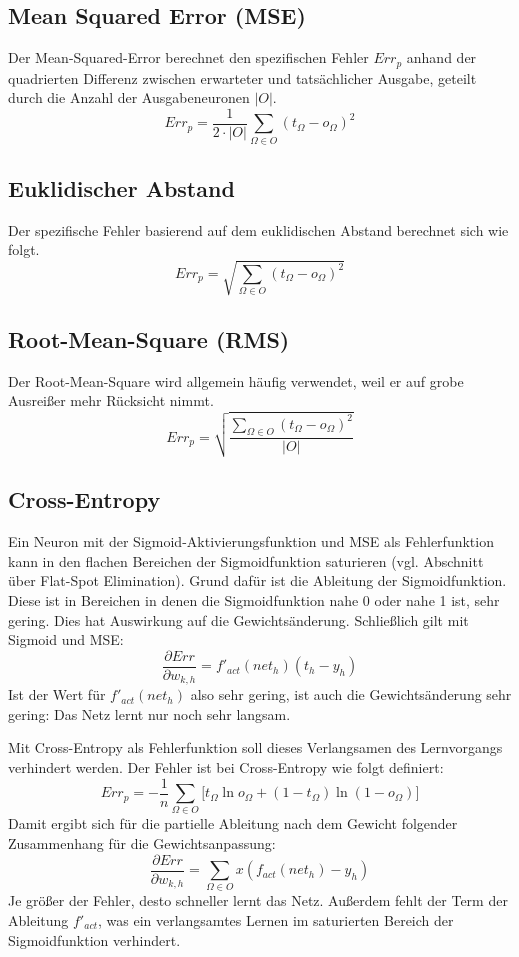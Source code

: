 \subsection*{Mean Squared Error (MSE)}
Der Mean-Squared-Error berechnet den spezifischen Fehler $Err_p$ anhand der quadrierten Differenz zwischen erwarteter und tatsächlicher Ausgabe, geteilt durch die Anzahl der Ausgabeneuronen $|O|$.
\[
	Err_p = \frac{1}{2 \cdot |O|} 
		\sum_{\Omega \in O} ( t_{\Omega} - o_{\Omega})^2
\]

\subsection*{Euklidischer Abstand}
Der spezifische Fehler basierend auf dem euklidischen Abstand berechnet sich wie folgt.
\[
	Err_p = \sqrt{ \sum_{\Omega \in O} ( t_{\Omega} - o_{\Omega})^2 }
\]

\subsection*{Root-Mean-Square (RMS)}
Der Root-Mean-Square wird allgemein häufig verwendet, weil er auf grobe Ausreißer mehr Rücksicht nimmt.
\[
	Err_p = \sqrt{ \frac{
		\sum_{\Omega \in O} ( t_{\Omega} - o_{\Omega})^2 }
		{|O|}
		}
\]


\subsection*{Cross-Entropy}
Ein Neuron mit der Sigmoid-Aktivierungsfunktion und MSE als Fehlerfunktion kann in den flachen Bereichen der Sigmoidfunktion saturieren (vgl. Abschnitt über Flat-Spot Elimination).
Grund dafür ist die Ableitung der Sigmoidfunktion. Diese ist in Bereichen in denen die Sigmoidfunktion nahe 0 oder nahe 1 ist, sehr gering. Dies hat Auswirkung auf die Gewichtsänderung. Schließlich gilt mit Sigmoid und MSE:
\[
	\frac{\partial Err}{\partial w_{k,h}} = 
		f'_{act}(net_h) (t_h - y_h)
\]
Ist der Wert für $f'_{act}(net_h)$ also sehr gering, ist auch die Gewichtsänderung sehr gering: Das Netz lernt nur noch sehr langsam.

Mit Cross-Entropy als Fehlerfunktion soll dieses Verlangsamen des Lernvorgangs verhindert werden.
Der Fehler ist bei Cross-Entropy wie folgt definiert:
\[
	Err_p = -\frac{1}{n} \sum_{\Omega \in O} 
		\big[ t_{\Omega} \ln o_{\Omega} + (1-t_{\Omega} ) 
		\ln (1-o_{\Omega}) \big]
\]
Damit ergibt sich für die partielle Ableitung nach dem Gewicht folgender Zusammenhang für die Gewichtsanpassung:
\[
	\frac{\partial Err}{\partial w_{k,h}} = 
		\sum_{\Omega \in O} x ( f_{act}(net_h) - y_h )
\]
Je größer der Fehler, desto schneller lernt das Netz. Außerdem fehlt der Term der Ableitung $f'_{act}$, was ein verlangsamtes Lernen im saturierten Bereich der Sigmoidfunktion verhindert.

